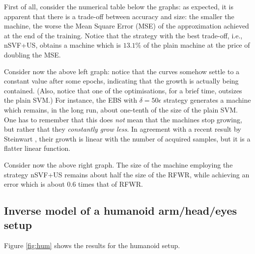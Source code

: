 \documentclass[conference]{IEEEtran}
\begin{document}
First of all, consider the numerical table below the graphs: as
expected, it is apparent that there is a trade-off between accuracy
and size: the smaller the machine, the worse the Mean Square Error
(MSE) of the approximation achieved at the end of the training. Notice
that the strategy with the best trade-off, i.e., nSVF+US, obtains a
machine which is $13.1\%$ of the plain machine at the price of
doubling the MSE.

Consider now the above left graph: notice that the curves somehow
settle to a constant value after some epochs, indicating that the
growth is actually being contained. (Also, notice that one of the
optimisations, for a brief time, outsizes the plain SVM.) For
instance, the EBS with $\delta=50\epsilon$ strategy generates a
machine which remains, in the long run, about one-tenth of the size of
the plain SVM. One has to remember that this does \emph{not} mean that
the machines stop growing, but rather that they \emph{constantly grow
less}. In agreement with a recent result by Steinwart
\cite{Steinwart03}, their growth is linear with the number of acquired
samples, but it is a flatter linear function.

Consider now the above right graph. The size of the machine employing
the strategy nSVF+US remains about half the size of the RFWR, while
achieving an error which is about $0.6$ times that of RFWR.

\subsection{Inverse model of a humanoid arm/head/eyes setup}

Figure \ref{fig:hum} shows the results for the humanoid setup.
\end{document}
